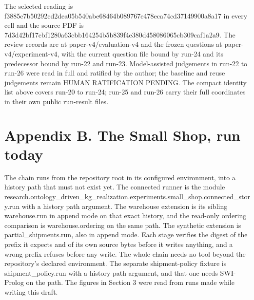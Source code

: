 The selected reading is {\small\ttfamily f3885c7b\allowbreak{}50292cd2\allowbreak{}dea05b54\allowbreak{}0abe6846\allowbreak{}4b089767\allowbreak{}e478eca7\allowbreak{}4cd37149\allowbreak{}900a8a17} in every cell and the source PDF is {\small\ttfamily 7d3d42bf\allowbreak{}17cbf128\allowbreak{}0a63cbb1\allowbreak{}64254b5b\allowbreak{}839f4e38\allowbreak{}0d458086\allowbreak{}065cb309\allowbreak{}caf1a2a9}. The review records are at paper-v4/evaluation-v4 and the frozen questions at paper-v4/experiment-v4, with the current question file bound by run-24 and its predecessor bound by run-22 and run-23. Model-assisted judgements in run-22 to run-26 were read in full and ratified by the author; the baseline and reuse judgements remain HUMAN RATIFICATION PENDING. The compact identity list above covers run-20 to run-24; run-25 and run-26 carry their full coordinates in their own public run-result files.

\clearpage
\section*{Appendix B. The Small Shop, run today}

The chain runs from the repository root in its configured environment, into a history path that must not exist yet. The connected runner is the module research.ontology\_\allowbreak{}driven\_\allowbreak{}kg\_\allowbreak{}realization.experiments.small\_\allowbreak{}shop.connected\_\allowbreak{}story.run with a history path argument. The warehouse extension is its sibling warehouse.run in append mode on that exact history, and the read-only ordering comparison is warehouse.ordering on the same path. The synthetic extension is partial\_\allowbreak{}shipments.run, also in append mode. Each stage verifies the digest of the prefix it expects and of its own source bytes before it writes anything, and a wrong prefix refuses before any write. The whole chain needs no tool beyond the repository's declared environment. The separate shipment-policy fixture is shipment\_\allowbreak{}policy.run with a history path argument, and that one needs SWI-Prolog on the path. The figures in Section 3 were read from runs made while writing this draft.

